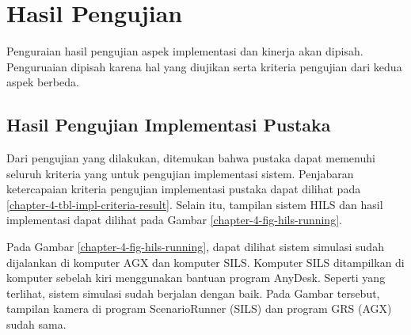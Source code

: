 \section{Hasil Pengujian}

Penguraian hasil pengujian aspek implementasi dan kinerja akan dipisah.
Penguruaian dipisah karena hal yang diujikan serta kriteria pengujian dari kedua
aspek berbeda.

\subsection{Hasil Pengujian Implementasi Pustaka}

Dari pengujian yang dilakukan, ditemukan bahwa pustaka dapat memenuhi seluruh
kriteria yang untuk pengujian implementasi sistem. Penjabaran ketercapaian
kriteria pengujian implementasi pustaka dapat dilihat pada
\ref{chapter-4-tbl-impl-criteria-result}. Selain itu, tampilan sistem HILS dan
hasil implementasi dapat dilihat pada Gambar \ref{chapter-4-fig-hils-running}.

Pada Gambar \ref{chapter-4-fig-hils-running}, dapat dilihat sistem simulasi
sudah dijalankan di komputer AGX dan komputer SILS. Komputer SILS ditampilkan di
komputer sebelah kiri menggunakan bantuan program AnyDesk. Seperti yang
terlihat, sistem simulasi sudah berjalan dengan baik. Pada Gambar tersebut,
tampilan kamera di program ScenarioRunner (SILS) dan program GRS (AGX) sudah
sama.

